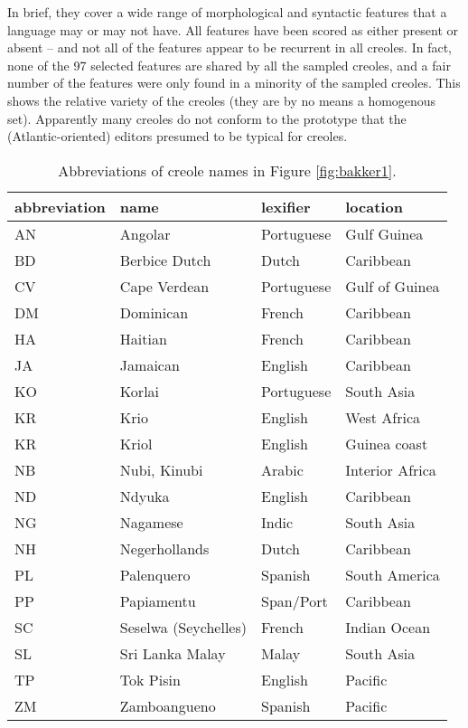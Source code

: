 In brief, they cover a wide range of morphological and syntactic features that  a language may or may not have. All features have been scored as either present or absent -- and not all of the features appear to be recurrent in all creoles. In fact, none of the 97 selected features are shared by all the sampled creoles, and a fair number of the features were only found in a minority of the sampled creoles. This shows the relative variety of the creoles (they are by no means a homogenous set). Apparently many creoles do not conform to the prototype that the (Atlantic-oriented) editors presumed to be typical for creoles.

\begin{table}%
\begin{tabular}{llll}
abbreviation & name & lexifier & location\\
\hline
AN & Angolar  & Portuguese  & Gulf Guinea \\
BD & Berbice Dutch & Dutch & Caribbean \\
CV & Cape Verdean & Portuguese  & Gulf of Guinea\\
DM & Dominican & French & Caribbean\\
HA & Haitian & French & Caribbean\\
JA & Jamaican & English & Caribbean\\
KO & Korlai & Portuguese & South Asia\\
KR & Krio & English & West Africa\\
KR & Kriol & English & Guinea coast\\
NB & Nubi, Kinubi & Arabic & Interior Africa \\
ND & Ndyuka  & English & Caribbean \\
NG & Nagamese & Indic & South Asia\\
NH & Negerhollands & Dutch & Caribbean \\
PL & Palenquero & Spanish & South America\\
PP & Papiamentu & Span/Port & Caribbean\\
SC & Seselwa (Seychelles) & French & Indian Ocean\\
SL & Sri Lanka Malay & Malay & South Asia\\
TP & Tok Pisin & English & Pacific \\
ZM & Zamboangueno & Spanish & Pacific\\
\end{tabular}
 \caption{Abbreviations of creole names in Figure \ref{fig:bakker1}.}
\label{bakker:tab:1}
\end{table}

